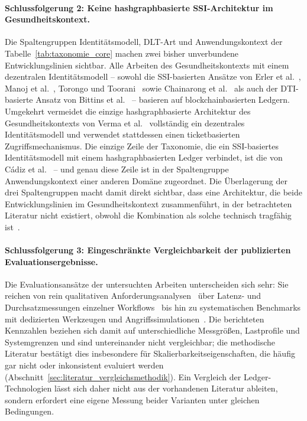 \paragraph{Schlussfolgerung 2: Keine hashgraphbasierte SSI-Architektur im Gesundheitskontext.}
Die Spaltengruppen Identitätsmodell, DLT-Art und Anwendungskontext der Tabelle~\ref{tab:taxonomie_core} machen zwei bisher unverbundene Entwicklungslinien sichtbar. Alle Arbeiten des Gesundheitskontexts mit einem dezentralen Identitätsmodell -- sowohl die SSI-basierten Ansätze von Erler et al.~\cite{erler2023}, Manoj et al.~\cite{manoj2022}, Torongo und Toorani~\cite{torongo2023} sowie Chainarong et al.~\cite{chainarong2025} als auch der DTI-basierte Ansatz von Bittins et al.~\cite{bittins2021} -- basieren auf blockchainbasierten Ledgern. Umgekehrt vermeidet die einzige hashgraphbasierte Architektur des Gesundheitskontexts von Verma et al.~\cite{verma2024} vollständig ein dezentrales Identitätsmodell und verwendet stattdessen einen ticketbasierten Zugriffsmechanismus. Die einzige Zeile der Taxonomie, die ein SSI-basiertes Identitätsmodell mit einem hashgraphbasierten Ledger verbindet, ist die von Cádiz et al.~\cite{cadiz2025} -- und genau diese Zeile ist in der Spaltengruppe Anwendungskontext einer anderen Domäne zugeordnet. Die Überlagerung der drei Spaltengruppen macht damit direkt sichtbar, dass eine Architektur, die beide Entwicklungslinien im Gesundheitskontext zusammenführt, in der betrachteten Literatur nicht existiert, obwohl die Kombination als solche technisch tragfähig ist~\cite{cadiz2025, satybaldy2026}.

\paragraph{Schlussfolgerung 3: Eingeschränkte Vergleichbarkeit der publizierten Evaluationsergebnisse.} 
Die Evaluationsansätze der untersuchten Arbeiten unterscheiden sich sehr: Sie reichen von rein qualitativen Anforderungsanalysen~\cite{erler2023, bittins2021} über Latenz- und Durchsatzmessungen einzelner Workflows~\cite{manoj2022, torongo2023, chainarong2025} bis hin zu systematischen Benchmarks mit dedizierten Werkzeugen und Angriffssimulationen~\cite{tawfik2025, joshimahajan2025}. Die berichteten Kennzahlen beziehen sich damit auf unterschiedliche Messgrößen, Lastprofile und Systemgrenzen und sind untereinander nicht vergleichbar; die methodische Literatur bestätigt dies insbesondere für Skalierbarkeitseigenschaften, die häufig gar nicht oder inkonsistent evaluiert werden (Abschnitt~\ref{sec:literatur_vergleichsmethodik}). Ein Vergleich der Ledger-Technologien lässt sich daher nicht aus der vorhandenen Literatur ableiten, sondern erfordert eine eigene Messung beider Varianten unter gleichen Bedingungen.

